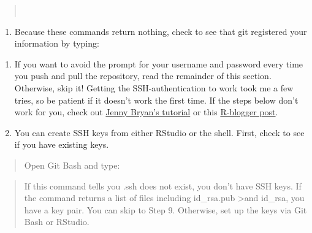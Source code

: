 \documentclass[12pt,]{article}
\providecommand{\tightlist}{%
  \setlength{\itemsep}{0pt}\setlength{\parskip}{0pt}}
\begin{document}
\begin{quote}
\colorbox{light-gray}{}\\
\colorbox{light-gray}{}
\end{quote}

\begin{enumerate}
\def\labelenumi{\arabic{enumi}.}
\setcounter{enumi}{2}
\tightlist
\item
  Because these commands return nothing, check to see that git
  registered your information by typing:
\end{enumerate}

\begin{quote}
\colorbox{light-gray}{}
\end{quote}

\begin{enumerate}
\def\labelenumi{\arabic{enumi}.}
\setcounter{enumi}{3}
\item
  If you want to avoid the prompt for your username and password every
  time you push and pull the repository, read the remainder of this
  section. Otherwise, skip it! Getting the SSH-authentication to work
  took me a few tries, so be patient if it doesn't work the first time.
  If the steps below don't work for you, check out
  \href{http://happygitwithr.com/}{Jenny Bryan's tutorial} or this
  \href{http://www.r-bloggers.com/rstudio-pushing-to-github-with-ssh-authentication/}{R-blogger
  post}.
\item
  You can create SSH keys from either RStudio or the shell. First, check
  to see if you have existing keys.
\end{enumerate}

\begin{quote}
Open Git Bash and type:
\end{quote}

\begin{quote}
\colorbox{light-gray}{}
\end{quote}

\begin{quote}
If this command tells you .ssh does not exist, you don't have SSH keys.
If the command returns a list of files including id\_rsa.pub
\textgreater{}and id\_rsa, you have a key pair. You can skip to Step 9.
Otherwise, set up the keys via Git Bash or RStudio.
\end{quote}
\end{document}
